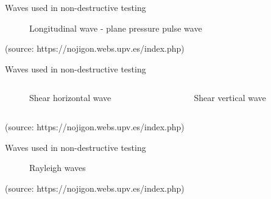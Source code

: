 \documentclass[10pt,aspectratio=169,dvipsnames]{beamer} %
\begin{document}
\setcounter{subfigure}{0}
\begin{frame}{Waves used in non-destructive testing}
	\begin{figure}
		\caption{\alert{Longitudinal wave} - plane pressure pulse wave}
	\end{figure}
\tiny 
(source: https://nojigon.webs.upv.es/index.php)
\end{frame}
\setcounter{subfigure}{0}
\begin{frame}{Waves used in non-destructive testing}
	\begin{columns}[T]
		\begin{column}{0.5\textwidth}
			\centering
			\begin{figure}
				\caption{\alert{Shear horizontal wave}}
			\end{figure}			
		\end{column}
		\begin{column}{0.5\textwidth}
			\centering
			\begin{figure}
				\caption{\alert{Shear vertical wave}}
			\end{figure}			
		\end{column}	
	\end{columns}
\tiny 
(source: https://nojigon.webs.upv.es/index.php)
\end{frame}
\setcounter{subfigure}{0}
\begin{frame}{Waves used in non-destructive testing}
	\begin{figure}
		\centering
		\caption{\alert{Rayleigh waves}}		
	\end{figure}			
\tiny 
(source: https://nojigon.webs.upv.es/index.php)
\end{frame}
\end{document}
